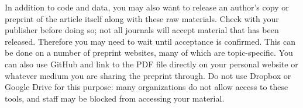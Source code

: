 In addition to code and data,
you may also want to release an author's copy or preprint
of the article itself along with these raw materials.
Check with your publisher before doing so;
not all journals will accept material that has been released.
Therefore you may need to wait until acceptance is confirmed.
This can be done on a number of preprint websites,
many of which are topic-specific.
You can also use GitHub and link to the PDF file directly
on your personal website or whatever medium you are
sharing the preprint through.
Do not use Dropbox or Google Drive for this purpose:
many organizations do not allow access to these tools,
and staff may be blocked from accessing your material.
